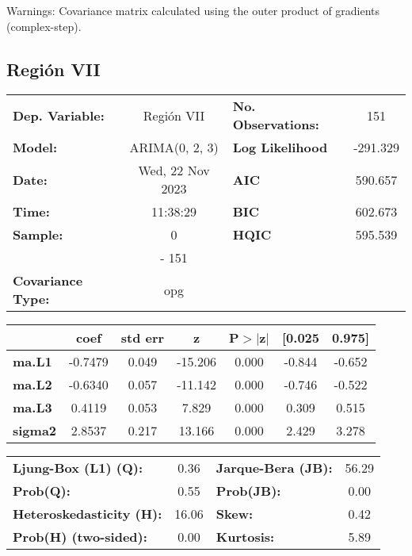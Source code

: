 \documentclass{article}%
\begin{document}
Warnings: \newline
 [1] Covariance matrix calculated using the outer product of gradients (complex-step).%
\subsection*{Región VII}%
\begin{center}
\begin{tabular}{lclc}
\toprule
\textbf{Dep. Variable:}          &    Región VII    & \textbf{  No. Observations:  } &    151      \\
\textbf{Model:}                  &  ARIMA(0, 2, 3)  & \textbf{  Log Likelihood     } &  -291.329   \\
\textbf{Date:}                   & Wed, 22 Nov 2023 & \textbf{  AIC                } &  590.657    \\
\textbf{Time:}                   &     11:38:29     & \textbf{  BIC                } &  602.673    \\
\textbf{Sample:}                 &        0         & \textbf{  HQIC               } &  595.539    \\
\textbf{}                        &       - 151      & \textbf{                     } &             \\
\textbf{Covariance Type:}        &       opg        & \textbf{                     } &             \\
\bottomrule
\end{tabular}
\begin{tabular}{lcccccc}
                & \textbf{coef} & \textbf{std err} & \textbf{z} & \textbf{P$> |$z$|$} & \textbf{[0.025} & \textbf{0.975]}  \\
\midrule
\textbf{ma.L1}  &      -0.7479  &        0.049     &   -15.206  &         0.000        &       -0.844    &       -0.652     \\
\textbf{ma.L2}  &      -0.6340  &        0.057     &   -11.142  &         0.000        &       -0.746    &       -0.522     \\
\textbf{ma.L3}  &       0.4119  &        0.053     &     7.829  &         0.000        &        0.309    &        0.515     \\
\textbf{sigma2} &       2.8537  &        0.217     &    13.166  &         0.000        &        2.429    &        3.278     \\
\bottomrule
\end{tabular}
\begin{tabular}{lclc}
\textbf{Ljung-Box (L1) (Q):}     &  0.36 & \textbf{  Jarque-Bera (JB):  } & 56.29  \\
\textbf{Prob(Q):}                &  0.55 & \textbf{  Prob(JB):          } &  0.00  \\
\textbf{Heteroskedasticity (H):} & 16.06 & \textbf{  Skew:              } &  0.42  \\
\textbf{Prob(H) (two-sided):}    &  0.00 & \textbf{  Kurtosis:          } &  5.89  \\
\bottomrule
\end{tabular}
\end{center}
\end{document}
